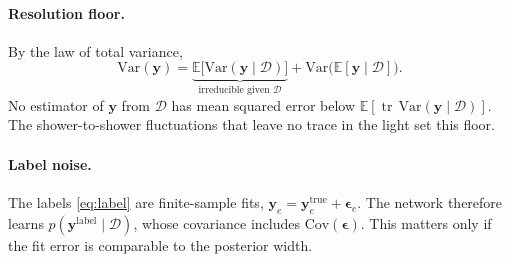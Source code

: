 \documentclass[11pt]{article}
\theoremstyle{definition}
\newcommand{\D}{\mathcal{D}}
\newcommand{\y}{\bm{y}}
\newcommand{\E}{\mathbb{E}}
\DeclareMathOperator{\tr}{tr}
\begin{document}
\paragraph{Resolution floor.}
By the law of total variance,
\begin{equation}
  \mathrm{Var}(\y) = \underbrace{\E\big[\mathrm{Var}(\y\mid\D)\big]}_{\text{irreducible given }\D}
  + \mathrm{Var}\big(\E[\y\mid\D]\big).
\end{equation}
No estimator of $\y$ from $\D$ has mean squared error below $\E[\tr\,\mathrm{Var}(\y\mid\D)]$.
The shower-to-shower fluctuations that leave no trace in the light set this floor.

\paragraph{Label noise.}
The labels \eqref{eq:label} are finite-sample fits, $\y_e = \y_e^{\text{true}} + \bm{\epsilon}_e$.
The network therefore learns $p(\y^{\text{label}}\mid\D)$, whose covariance includes
$\mathrm{Cov}(\bm{\epsilon})$. This matters only if the fit error is comparable to the
posterior width.
\end{document}
